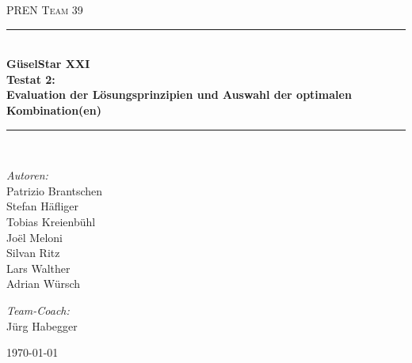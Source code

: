 \begin{titlepage}   

\begin{center}
\textsc{\Large PREN Team 39}\\[0.5cm]

\newcommand{\HRule}{\rule{\linewidth}{0.5mm}}
\HRule \\[0.4cm]
{ \huge \bfseries GüselStar XXI}\\[0.4cm]
{ \huge \bfseries Testat 2: }\\[0.4cm]
{ \LARGE \bfseries Evaluation der Lösungsprinzipien und Auswahl der optimalen Kombination(en)}\\[0.4cm]
\HRule \\[1.5cm]

\begin{minipage}{0.4\textwidth}
\begin{flushleft} \large
\emph{Autoren:}\\
Patrizio Brantschen\\
Stefan Häfliger\\
Tobias Kreienbühl\\
Joël Meloni\\
Silvan Ritz\\
Lars Walther\\
Adrian Würsch
\end{flushleft}
\end{minipage}
\hfill
\begin{minipage}{0.4\textwidth}
\begin{flushright} \large
\emph{Team-Coach:} \\
Jürg Habegger
\end{flushright}
\end{minipage}

\vfill

{\large \today}

\end{center}
\end{titlepage}
